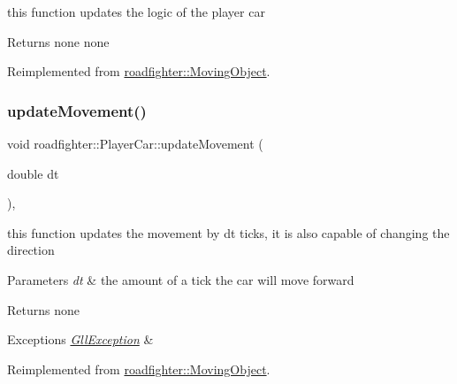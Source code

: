 this function updates the logic of the player car \begin{DoxyReturn}{Returns}
none  none 
\end{DoxyReturn}


Reimplemented from \hyperlink{classroadfighter_1_1MovingObject_a2c5d69054a59fc5c6d7458f864ee9d57}{roadfighter\+::\+Moving\+Object}.

\mbox{\label{classroadfighter_1_1PlayerCar_aa1dcbec01dde1b212e4919b61338edde}} 
\subsubsection{\texorpdfstring{update\+Movement()}{updateMovement()}}
{\footnotesize\ttfamily void roadfighter\+::\+Player\+Car\+::update\+Movement (\begin{DoxyParamCaption}\item[{double}]{dt }\end{DoxyParamCaption})\hspace{0.3cm}{\ttfamily [override]}, {\ttfamily [virtual]}}

this function updates the movement by dt ticks, it is also capable of changing the direction 
\begin{DoxyParams}{Parameters}
{\em dt} & the amount of a tick the car will move forward \\
\hline
\end{DoxyParams}
\begin{DoxyReturn}{Returns}
none 
\end{DoxyReturn}

\begin{DoxyExceptions}{Exceptions}
{\em \hyperlink{classroadfighter_1_1GllException}{Gll\+Exception}} & \\
\hline
\end{DoxyExceptions}


Reimplemented from \hyperlink{classroadfighter_1_1MovingObject_ac1918d96dac118c4bd7d99168d92867c}{roadfighter\+::\+Moving\+Object}.

\mbox{\label{classroadfighter_1_1PlayerCar_a12f0da24565a4fe64a7bf17fc7c37152}} 
